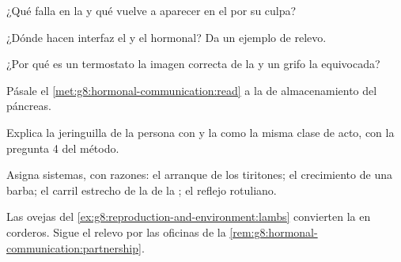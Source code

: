 \begin{exercise}[$\star$]\label{exo:g8:hormonal-communication:5}
¿Qué falla en la  y qué vuelve a aparecer en el  por su
culpa?
\end{exercise}

\begin{exercise}[$\star$]\label{exo:g8:hormonal-communication:6}
¿Dónde hacen interfaz el  y el hormonal? Da un ejemplo
de relevo.
\end{exercise}

\begin{exercise}[$\star\star$]\label{exo:g8:hormonal-communication:7}
¿Por qué es un termostato la imagen correcta de la  y
un grifo la equivocada?
\end{exercise}

\begin{exercise}[$\star\star$]\label{exo:g8:hormonal-communication:8}
Pásale el \cref{met:g8:hormonal-communication:read} a la  de
almacenamiento del páncreas.
\end{exercise}

\begin{exercise}[$\star\star$]\label{exo:g8:hormonal-communication:9}
Explica la jeringuilla de la persona con  y la  como la misma clase de acto, con la pregunta 4 del
método.
\end{exercise}

\begin{exercise}[$\star\star$]\label{exo:g8:hormonal-communication:10}
Asigna sistemas, con razones: el arranque de los tiritones; el
crecimiento de una barba; el carril estrecho de la  de la
; el reflejo rotuliano.
\end{exercise}

\begin{exercise}[$\star\star$]\label{exo:g8:hormonal-communication:11}
Las ovejas del \cref{ex:g8:reproduction-and-environment:lambs}
convierten la  en corderos. Sigue el relevo por las oficinas de la
\cref{rem:g8:hormonal-communication:partnership}.
\end{exercise}

